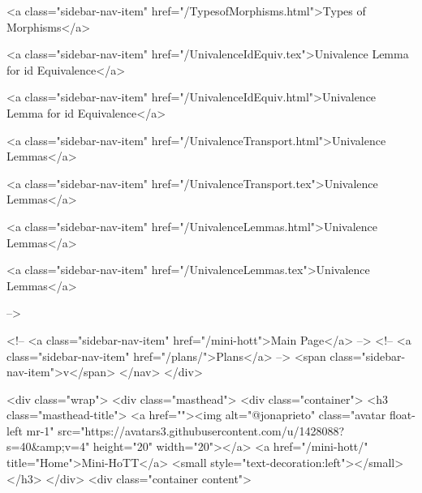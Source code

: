       
    
      
        
          <a class="sidebar-nav-item" href="/TypesofMorphisms.html">Types of Morphisms</a>
        
      
    
      
        
          <a class="sidebar-nav-item" href="/UnivalenceIdEquiv.tex">Univalence Lemma for id Equivalence</a>
        
      
    
      
        
          <a class="sidebar-nav-item" href="/UnivalenceIdEquiv.html">Univalence Lemma for id Equivalence</a>
        
      
    
      
        
          <a class="sidebar-nav-item" href="/UnivalenceTransport.html">Univalence Lemmas</a>
        
      
    
      
        
          <a class="sidebar-nav-item" href="/UnivalenceTransport.tex">Univalence Lemmas</a>
        
      
    
      
        
          <a class="sidebar-nav-item" href="/UnivalenceLemmas.html">Univalence Lemmas</a>
        
      
    
      
        
          <a class="sidebar-nav-item" href="/UnivalenceLemmas.tex">Univalence Lemmas</a>
        
      
     -->

    <!-- <a class="sidebar-nav-item" href="/mini-hott">Main Page</a> -->
    <!-- <a class="sidebar-nav-item" href="/plans/">Plans</a> -->
    <span class="sidebar-nav-item">v</span>
  </nav>
</div>

    <div class="wrap">
      <div class="masthead">
        <div class="container">
          <h3 class="masthead-title">
            <a href=""><img alt="@jonaprieto" class="avatar float-left mr-1" src="https://avatars3.githubusercontent.com/u/1428088?s=40&amp;v=4" height="20" width="20"></a>
            <a href="/mini-hott/" title="Home">Mini-HoTT</a>
            <small style="text-decoration:left"></small>
          </h3>
        </div>
      <div class="container content">
        







